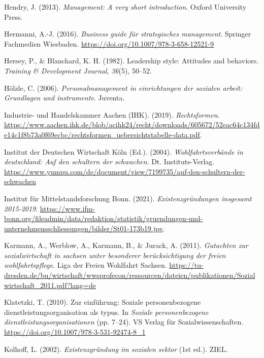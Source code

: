 \documentclass[
  letterpaper,
]{book}
\newlength{\cslhangindent}
\newenvironment{CSLReferences}[2] %
 {\begin{list}{}{%
  \setlength{\itemindent}{0pt}
  \setlength{\leftmargin}{0pt}
  \setlength{\parsep}{0pt}
  \ifodd #1
   \setlength{\leftmargin}{\cslhangindent}
   \setlength{\itemindent}{-1\cslhangindent}
  \fi
  \setlength{\itemsep}{#2\baselineskip}}}
 {\end{list}}
\begin{document}
\begin{CSLReferences}{1}{0}
Hendry, J. (2013). \emph{Management: A very short introduction}. Oxford
University Press.

Hermanni, A.-J. (2016). \emph{Business guide für strategisches
management}. Springer Fachmedien Wiesbaden.
\url{https://doi.org/10.1007/978-3-658-12521-9}

Hersey, P., \& Blanchard, K. H. (1982). Leadership style: Attitudes and
behaviors. \emph{Training \& Development Journal}, \emph{36}(5), 50--52.

Hölzle, C. (2006). \emph{Personalmanagement in einrichtungen der
sozialen arbeit: Grundlagen und instrumente}. Juventa.

Industrie- und Handelskammer Aachen (IHK). (2019). \emph{Rechtsformen}.
\url{https://www.aachen.ihk.de/blob/acihk24/recht/downloads/605672/52eac64c134fde14c1f8b73a0f69ecbc/rechtsformen_uebersichtstabelle-data.pdf}.

Institut der Deutschen Wirtschaft Köln (Ed.). (2004).
\emph{Wohlfahrtsverbände in deutschland: Auf den schultern der
schwachen}. Dt. Instituts-Verlag.
\url{https://www.yumpu.com/de/document/view/7199735/auf-den-schultern-der-schwachen}

Institut für Mittelstandsforschung Bonn. (2021).
\emph{Existenzgründungen insgesamt 2015-2019}.
\url{https://www.ifm-bonn.org/fileadmin/data/redaktion/statistik/gruendungen-und-unternehmensschliessungen/bilder/St01-173b19.jpg}.

Karmann, A., Werblow, A., Karmann, B., \& Jurack, A. (2011).
\emph{Gutachten zur sozialwirtschaft in sachsen unter besonderer
berücksichtigung der freien wohlfahrtspflege}. Liga der Freien Wohlfahrt
Sachsen.
\url{https://tu-dresden.de/bu/wirtschaft/wwsprofecon/ressourcen/dateien/publikationen/Sozialwirtschaft_2011.pdf?lang=de}

Klatetzki, T. (2010). Zur einführung: Soziale personenbezogene
dienstleistungsorganisation als typus. In \emph{Soziale personenbezogene
dienstleistungsorganisationen} (pp. 7--24). VS Verlag für
Sozialwissenschaften. \url{https://doi.org/10.1007/978-3-531-92474-8_1}

Kolhoff, L. (2002). \emph{Existenzgründung im sozialen sektor} (1st
ed.). ZIEL.


\end{CSLReferences}
\end{document}
